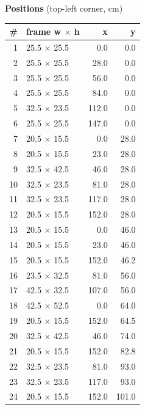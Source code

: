 \documentclass[a4paper,landscape,10pt]{article}
\begin{document}
\begin{minipage}[t]{0.25\textwidth}
\vspace{8pt}
{\bfseries Positions} (top-left corner, cm)\\[2pt]
\tiny
\begin{tabular}{@{}r l r r@{}}
\toprule
\# & frame w $\times$ h & x & y \\
\midrule
1 & 25.5 $\times$ 25.5 & 0.0 & 0.0 \\
2 & 25.5 $\times$ 25.5 & 28.0 & 0.0 \\
3 & 25.5 $\times$ 25.5 & 56.0 & 0.0 \\
4 & 25.5 $\times$ 25.5 & 84.0 & 0.0 \\
5 & 32.5 $\times$ 23.5 & 112.0 & 0.0 \\
6 & 25.5 $\times$ 25.5 & 147.0 & 0.0 \\
7 & 20.5 $\times$ 15.5 & 0.0 & 28.0 \\
8 & 20.5 $\times$ 15.5 & 23.0 & 28.0 \\
9 & 32.5 $\times$ 42.5 & 46.0 & 28.0 \\
10 & 32.5 $\times$ 23.5 & 81.0 & 28.0 \\
11 & 32.5 $\times$ 23.5 & 117.0 & 28.0 \\
12 & 20.5 $\times$ 15.5 & 152.0 & 28.0 \\
13 & 20.5 $\times$ 15.5 & 0.0 & 46.0 \\
14 & 20.5 $\times$ 15.5 & 23.0 & 46.0 \\
15 & 20.5 $\times$ 15.5 & 152.0 & 46.2 \\
16 & 23.5 $\times$ 32.5 & 81.0 & 56.0 \\
17 & 42.5 $\times$ 32.5 & 107.0 & 56.0 \\
18 & 42.5 $\times$ 52.5 & 0.0 & 64.0 \\
19 & 20.5 $\times$ 15.5 & 152.0 & 64.5 \\
20 & 32.5 $\times$ 42.5 & 46.0 & 74.0 \\
21 & 20.5 $\times$ 15.5 & 152.0 & 82.8 \\
22 & 32.5 $\times$ 23.5 & 81.0 & 93.0 \\
23 & 32.5 $\times$ 23.5 & 117.0 & 93.0 \\
24 & 20.5 $\times$ 15.5 & 152.0 & 101.0 \\
\bottomrule
\end{tabular}
\end{minipage}
\clearpage
\end{document}
